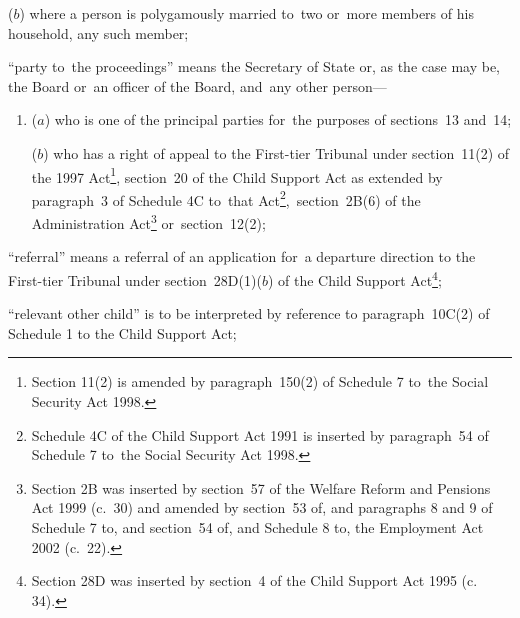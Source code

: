 \documentclass[12pt,a4paper]{article}
\begin{document}
\begin{enumerate}
\begin{enumerate}
    ($b$) 
    where a person is polygamously married to~two or~more members of his household, any such member;
\end{enumerate}

“party to~the proceedings” means the Secretary of State 
or, as the case may be, the Board or~an officer of the Board,  %
and~any other person—
\begin{enumerate}\item[]
($a$) who is one of the principal parties for~the purposes of sections~13 and~14;

($b$) who has a right of appeal to 
the First-tier Tribunal  %
under section~11(2) of the 1997 Act\footnote{\frenchspacing Section 11(2) is amended by paragraph~150(2) of Schedule 7 to~the Social Security Act 1998.}, section~20 of the Child Support Act as extended by paragraph~3 of Schedule 4C to~that Act\footnote{\frenchspacing Schedule 4C of the Child Support Act 1991 is inserted by paragraph~54 of Schedule 7 to~the Social Security Act 1998.},~section~2B(6) of the Administration Act\footnote{Section 2B was inserted by section~57 of the Welfare Reform and Pensions Act 1999 (c.~30) and amended by section~53 of, and paragraphs 8 and 9 of Schedule 7 to, and section~54 of, and Schedule 8 to, the Employment Act 2002 (c.~22).}  %
or~section~12(2);
\end{enumerate}


“referral” means a referral of an application for~a departure direction to 
the First-tier Tribunal  %
under section~28D(1)($b$) of the Child Support Act\footnote{\frenchspacing Section 28D was inserted by section~4 of the Child Support Act 1995 (c. 34).};

\begin{sloppypar}
“relevant other child” is to be interpreted by reference to paragraph~10C(2) of Schedule 1 to the Child Support Act;
\end{sloppypar}


\end{enumerate}
\end{document}
